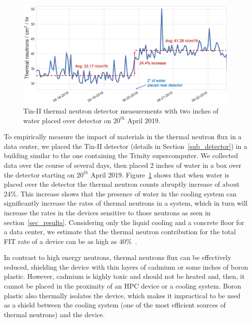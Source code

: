 \begin{figure}[tb] 
\centering
\includegraphics[width=0.82\columnwidth]{./figs/turkeypan_PR}
\caption{Tin-II thermal neutron detector measurements with two inches of water placed over detector on $20^{th}$ April 2019.}
\label{turkeypan}

\end{figure}
\label{sub_flux}
To  empirically measure the impact of materials in the thermal neutron flux in a data center, we placed the Tin-II detector (details in Section~\ref{sub_detector}) in a building similar to the one containing the Trinity supercomputer. We collected data over the course of several days, then placed 2 inches of water in a box over the detector starting on $20^{th}$ April 2019. Figure~\ref{turkeypan} shows that when water is placed over the detector the thermal neutron counts abruptly increase of about 24\%. This increase shows that the presence of water in the cooling system can significantly increase the rates of thermal neutrons in a system, which in turn will increase the rates in the devices sensitive to those neutrons as seen in section~\ref{sec_results}. Considering only the liquid cooling and a concrete floor for a data center, we estimate that the thermal neutron contribution for the total FIT rate of a device can be as high as 40\%~\cite{jsc2020}.

In contrast to high energy neutrons, thermal neutrons flux can be effectively reduced, shielding the device with thin layers of cadmium or some inches of boron plastic. However, cadmium is highly toxic and should not be heated and, then, it cannot be placed in the proximity of an HPC device or a cooling system. Boron plastic also thermally isolates the device, which makes it impractical to be used as a shield between the cooling system (one of the most efficient sources of thermal neutrons) and the device.


